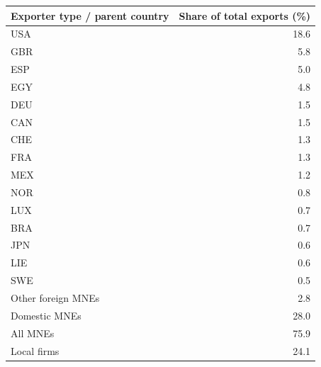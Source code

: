 \begin{tabular}{lr}
\toprule
Exporter type / parent country & Share of total exports (\%) \\
\midrule
USA & 18.6 \\
GBR & 5.8 \\
ESP & 5.0 \\
EGY & 4.8 \\
DEU & 1.5 \\
CAN & 1.5 \\
CHE & 1.3 \\
FRA & 1.3 \\
MEX & 1.2 \\
NOR & 0.8 \\
LUX & 0.7 \\
BRA & 0.7 \\
JPN & 0.6 \\
LIE & 0.6 \\
SWE & 0.5 \\
Other foreign MNEs & 2.8 \\
Domestic MNEs & 28.0 \\
\midrule
All MNEs & 75.9 \\
Local firms & 24.1 \\
\bottomrule
\end{tabular}
